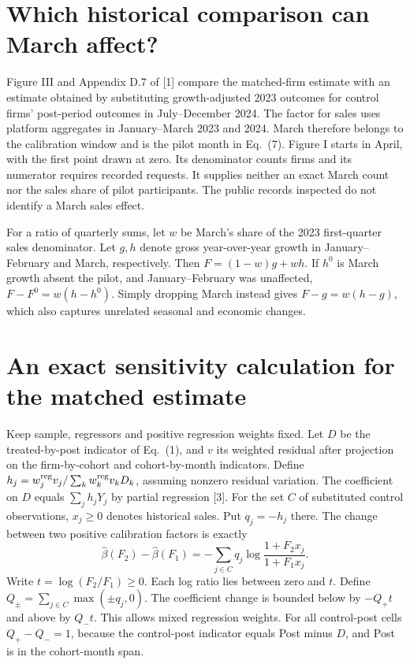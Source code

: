\documentclass[11pt,a4paper]{article}
\begin{document}
\section*{Which historical comparison can March affect?}
Figure III and Appendix D.7 of [1] compare the matched-firm estimate with an estimate obtained by substituting growth-adjusted 2023 outcomes for control firms' post-period outcomes in July--December 2024. The factor for sales uses platform aggregates in January--March 2023 and 2024. March therefore belongs to the calibration window and is the pilot month in Eq.~(7). Figure I starts in April, with the first point drawn at zero. Its denominator counts firms and its numerator requires recorded requests. It supplies neither an exact March count nor the sales share of pilot participants. The public records inspected do not identify a March sales effect.

For a ratio of quarterly sums, let $w$ be March's share of the 2023 first-quarter sales denominator. Let $g,h$ denote gross year-over-year growth in January--February and March, respectively. Then $F=(1-w)g+wh$. If $h^0$ is March growth absent the pilot, and January--February was unaffected, $F-F^0=w(h-h^0)$. Simply dropping March instead gives $F-g=w(h-g)$, which also captures unrelated seasonal and economic changes.

\newpage
\section*{An exact sensitivity calculation for the matched estimate}
Keep sample, regressors and positive regression weights fixed. Let $D$ be the treated-by-post indicator of Eq.~(1), and $v$ its weighted residual after projection on the firm-by-cohort and cohort-by-month indicators. Define $h_j=w_j^{\rm reg}v_j/\sum_k w_k^{\rm reg}v_kD_k$, assuming nonzero residual variation. The coefficient on $D$ equals $\sum_j h_jY_j$ by partial regression [3]. For the set $C$ of substituted control observations, $x_j\ge0$ denotes historical sales. Put $q_j=-h_j$ there. The change between two positive calibration factors is exactly
\[
 \widehat\beta(F_2)-\widehat\beta(F_1)
 =-\sum_{j\in C} q_j\log\!\frac{1+F_2x_j}{1+F_1x_j}.
\]
Write $t=\log(F_2/F_1)\ge0$. Each log ratio lies between zero and $t$. Define $Q_\pm=\sum_{j\in C}\max(\pm q_j,0)$. The coefficient change is bounded below by $-Q_+t$ and above by $Q_-t$. This allows mixed regression weights. For all control-post cells $Q_+-Q_-=1$, because the control-post indicator equals Post minus $D$, and Post is in the cohort-month span.
\end{document}
